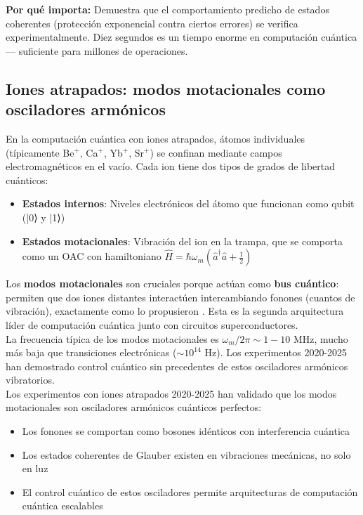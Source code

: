 \documentclass[11pt,a4paper,spanish]{book}
\begin{document}
\textbf{Por qué importa:} Demuestra que el comportamiento predicho de estados coherentes (protección exponencial contra ciertos errores) se verifica experimentalmente. Diez segundos es un tiempo enorme en computación cuántica — suficiente para millones de operaciones.


\subsection*{Iones atrapados: modos motacionales como osciladores armónicos}
En la computación cuántica con iones atrapados, átomos individuales (típicamente Be$^+$, Ca$^+$, Yb$^+$, Sr$^+$) se confinan mediante campos electromagnéticos en el vacío. Cada ion tiene dos tipos de grados de libertad cuánticos:

\begin{itemize}
	\item \textbf{Estados internos}: Niveles electrónicos del átomo que funcionan como qubit (|0⟩ y |1⟩)
	\item \textbf{Estados motacionales}: Vibración del ion en la trampa, que se comporta como un OAC con hamiltoniano $\hat{H} = \hbar\omega_m(\hat{a}^\dagger\hat{a} + \frac{1}{2})$
\end{itemize}

Los \textbf{modos motacionales} son cruciales porque actúan como \textbf{bus cuántico}: permiten que dos iones distantes interactúen intercambiando fonones (cuantos de vibración), exactamente como lo propusieron \cite{cirac1995}. Esta es la segunda arquitectura líder de computación cuántica junto con circuitos superconductores.\\

La frecuencia típica de los modos motacionales es $\omega_m/2\pi \sim 1-10$ MHz, mucho más baja que transiciones electrónicas ($\sim 10^{14}$ Hz). Los experimentos 2020-2025 han demostrado control cuántico sin precedentes de estos osciladores armónicos vibratorios.\\

Los experimentos con iones atrapados 2020-2025 han validado que los modos motacionales son osciladores armónicos cuánticos perfectos:

\begin{itemize}
	\item Los fonones se comportan como bosones idénticos con interferencia cuántica
	\item Los estados coherentes de Glauber existen en vibraciones mecánicas, no solo en luz
	\item El control cuántico de estos osciladores permite arquitecturas de computación cuántica escalables
\end{itemize}
\end{document}
